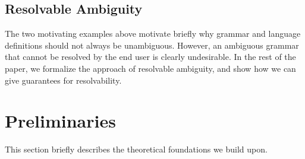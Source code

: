 \documentclass[acmsmall,review,anonymous]{acmart}\settopmatter{printfolios=true,printccs=false,printacmref=false}
\begin{document}



\subsection{Resolvable Ambiguity}
The two motivating examples above motivate briefly why grammar
and language definitions should not always be unambiguous. However, an
ambiguous grammar that cannot be resolved by the end user is clearly
undesirable. In the rest of the paper, we formalize the approach of
resolvable ambiguity, and show how we can give guarantees for
resolvability.




\section{Preliminaries}
\label{sec:prel}

This section briefly describes the theoretical foundations we build upon.

\end{document}
